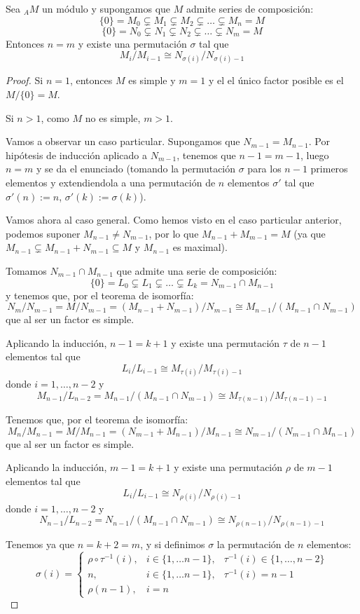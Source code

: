 \begin{teo}
  Sea \({}_AM\) un módulo y supongamos que \(M\) admite series de composición:
  \[
    \{0\}=M_0\subsetneq M_1\subsetneq M_2\subsetneq\ldots\subsetneq M_n=M
  \]
  \[
    \{0\}=N_0\subsetneq N_1\subsetneq N_2\subsetneq\ldots\subsetneq N_m=M
  \]
  Entonces \(n=m\) y existe una permutación \(\sigma\) tal que
  \[
    M_i/M_{i-1}\cong N_{\sigma(i)}/N_{\sigma(i)-1}
  \]
\end{teo}
\begin{proof}
  Si \(n=1\), entonces \(M\) es simple y \(m=1\) y el el único factor posible
  es el \(M/\{0\}=M\).

  Si \(n>1\), como \(M\) no es simple, \(m>1\).

  Vamos a observar un caso particular. Supongamos que \(N_{m-1}
  =M_{n-1}\). Por hipótesis de inducción aplicado a \(N_{m-1}\),
  tenemos que  \(n-1=m-1\), luego \(n=m\) y se da el enunciado
  (tomando la permutación \(\sigma\) para los \(n-1\) primeros elementos
  y extendiendola a una permutación de \(n\) elementos \(\sigma'\) tal
  que \(\sigma'(n):=n\), \(\sigma'(k):=\sigma(k)\)).

  Vamos ahora al caso general. Como hemos visto
  en el caso particular anterior, podemos suponer
  \(M_{n-1}\neq N_{m-1}\), por lo que
  \(M_{n-1}+M_{m-1}=M\) (ya que \(M_{n-1}\subsetneq M_{n-1}+
  N_{m-1}\subseteq M\) y \(M_{n-1}\) es maximal).

  Tomamos \(N_{m-1}\cap M_{n-1}\) que admite una serie de composición:
  \[
    \{0\}=L_0\subsetneq L_1\subsetneq\ldots\subsetneq L_k
    =N_{m-1}\cap M_{n-1}
  \]
  y tenemos que, por el teorema de isomorfía:
  \[
    N_m/N_{m-1}=
    M/N_{m-1}=
    (M_{n-1}+N_{m-1})/N_{m-1}\cong M_{n-1}/(M_{n-1}\cap N_{m-1})
  \]
  que al ser un factor es simple.

  Aplicando la inducción, \(n-1=k+1\) y existe una permutación
  \(\tau\) de \(n-1\) elementos tal que
  \[
    L_i/L_{i-1}\cong M_{\tau(i)}/M_{\tau(i)-1}
  \]
  donde \(i=1,\ldots, n-2\)
  y
  \[
    M_{n-1}/L_{n-2}=M_{n-1}/(M_{n-1}\cap N_{m-1})\cong
    M_{\tau(n-1)}/M_{\tau(n-1)-1}
  \]

  Tenemos que, por el teorema de isomorfía:
  \[
    M_n/M_{n-1}=
    M/M_{n-1}=
    (N_{m-1}+M_{n-1})/M_{n-1}\cong N_{m-1}/(N_{m-1}\cap M_{n-1})
  \]
  que al ser un factor es simple.

  Aplicando la inducción, \(m-1=k+1\) y existe una permutación
  \(\rho\) de \(m-1\) elementos tal que
  \[
    L_i/L_{i-1}\cong N_{\rho(i)}/N_{\rho(i)-1}
  \]
  donde \(i=1,\ldots, n-2\)
  y
  \[
    N_{n-1}/L_{n-2}=N_{n-1}/(M_{n-1}\cap N_{m-1})\cong
    N_{\rho(n-1)}/N_{\rho(n-1)-1}
  \]

  Tenemos ya que \(n=k+2=m\), y si definimos \(\sigma\) la permutación
  de \(n\) elementos:
  \[
    \sigma(i)=\left\{
      \begin{matrix}
        \rho\circ\tau^{-1}(i),
        &i\in\{1,\ldots n-1\}, &\tau^{-1}(i)\in\{1,\ldots, n-2\}\\
        n,
        &i\in\{1,\ldots n-1\}, &\tau^{-1}(i)=n-1\\
        \rho(n-1),
        &i=n &
      \end{matrix}
      \right.
  \]
\end{proof}

